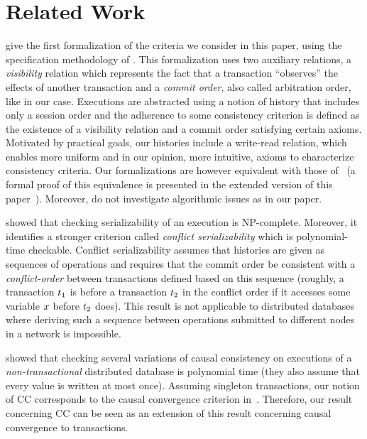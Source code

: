 
\section{Related Work}\label{sec:trans:related}

\cite{DBLP:conf/concur/Cerone0G15} give the first formalization of the criteria we consider in this paper, using the specification methodology of \cite{DBLP:conf/popl/BurckhardtGYZ14}. This formalization uses two auxiliary relations, a \emph{visibility} relation which represents the fact that a transaction ``observes'' the effects of another transaction and a \emph{commit order}, also called arbitration order, like in our case. Executions are abstracted using a notion of history that includes only a session order and the adherence to some consistency criterion is defined as the existence of a visibility relation and a commit order satisfying certain axioms. Motivated by practical goals, our histories include a write-read relation, which enables more uniform and in our opinion, more intuitive, axioms to characterize consistency criteria. Our formalizations are however equivalent with those of~\cite{DBLP:conf/concur/Cerone0G15} (a formal proof of this equivalence is presented in the extended version of this paper~\cite{DBLP:journals/corr/abs-1908-04509}). Moreover, \cite{DBLP:conf/concur/Cerone0G15} do not investigate algorithmic issues as in our paper.

\cite{DBLP:journals/jacm/Papadimitriou79b} showed that checking serializability of an execution is NP-complete. Moreover, it identifies a stronger criterion called \emph{conflict serializability} which is polynomial-time checkable. Conflict serializability assumes that histories are given as sequences of operations and requires that the commit order be consistent with a \emph{conflict-order} between transactions defined based on this sequence (roughly, a transaction ${t}_1$ is before a transaction ${t}_2$ in the conflict order if it accesses some variable ${x}$ before ${t}_2$ does). This result is not applicable to distributed databases where deriving such a sequence between operations submitted to different nodes in a network is impossible.

\cite{DBLP:conf/popl/BouajjaniEGH17} showed that checking several variations of causal consistency on executions of a \emph{non-transactional} distributed database is polynomial time (they also assume that every value is written at most once). 
Assuming singleton transactions, our notion of CC corresponds to the causal convergence criterion in~\cite{DBLP:conf/popl/BouajjaniEGH17}. Therefore, our result concerning CC can be seen as an extension of this result concerning causal convergence to transactions.

